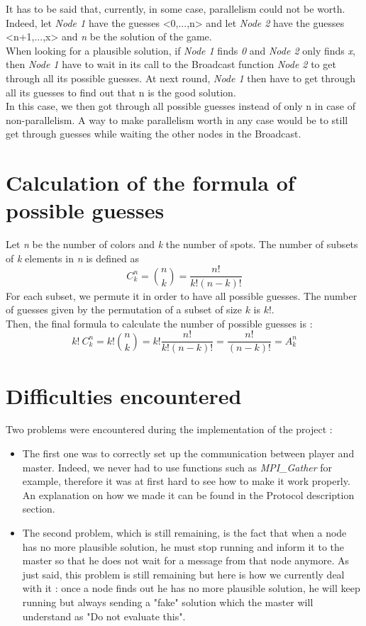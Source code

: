 \documentclass{article}
\begin{document}
\noindent It has to be said that, currently,  in some case, parallelism could not be worth. \\ Indeed, let \textit{Node 1} have the guesses <0,...,n> and let \textit{Node 2} have the guesses <n+1,...,x> and \textit{n} be the solution of the game. \\
When looking for a plausible solution, if \textit{Node 1} finds \textit{0} and \textit{Node 2} only finds \textit{x}, then \textit{Node 1} have to wait in its call to the Broadcast function \textit{Node 2} to get through all its possible guesses. At next round, \textit{Node 1} then have to get through all its guesses to find out that n is the good solution. \\
In this case, we then got through all possible guesses instead of only n in case of non-parallelism. A way to make parallelism worth in any case would be to still get through guesses while waiting the other nodes in the Broadcast.

\section{Calculation of the formula of possible guesses}

Let \textit{n} be the number of colors and \textit{k} the number of spots. The number of subsets of \textit{k} elements in \textit{n} is defined as $$C_{k}^{n} =  \binom{n}{k} = \frac{n!}{k!(n-k)!}$$
\noindent For each subset, we permute it in order to have all possible guesses. The number of guesses given by the permutation of a subset of size $k$ is $k!$.\\
Then, the final formula to calculate the number of possible guesses is : $$k!\ C_{k}^{n} =k! \binom{n}{k} = k! \frac{n!}{k!(n-k)!} = \frac{n!}{(n-k)!} = A_{k}^{n}$$


\section{Difficulties encountered}

Two problems were encountered during the implementation of the project : 
\begin{itemize}
    \item The first one was to correctly set up the communication between player and master. Indeed, we never had to use functions such as \textit{MPI\_Gather} for example, therefore it was at first hard to see how to make it work properly. An explanation on how we made it can be found in the Protocol description section.
    \item The second problem, which is still remaining, is the fact that when a node has no more plausible solution, he must stop running and inform it to the master so that he does not wait for a message from that node anymore. As just said, this problem is still remaining but here is how we currently deal with it : once a node finds out he has no more plausible solution, he will keep running but always sending a "fake" solution which the master will understand as "Do not evaluate this". 
\end{itemize}
\end{document}
